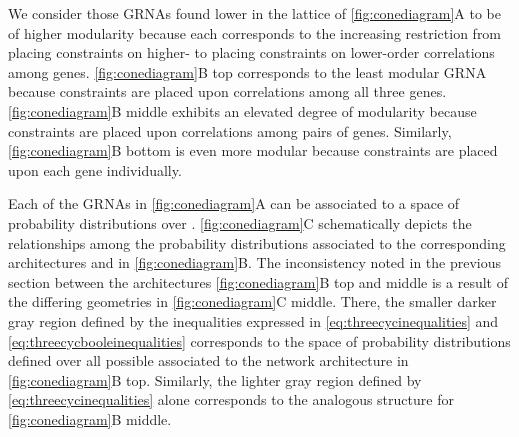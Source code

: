 We consider those GRNAs found lower in the lattice of \ref{fig:conediagram}A to be of higher modularity because each corresponds to the increasing restriction from placing constraints on higher- to placing constraints on lower-order correlations among genes. \ref{fig:conediagram}B top corresponds to the least modular GRNA because constraints are placed upon correlations among all three genes. \ref{fig:conediagram}B middle exhibits an elevated degree of modularity because constraints are placed upon correlations among pairs of genes. Similarly, \ref{fig:conediagram}B bottom is even more modular because constraints are placed upon each gene individually.

Each of the GRNAs in \ref{fig:conediagram}A can be associated to a space of probability distributions over \gnpm{}. \ref{fig:conediagram}C schematically depicts the relationships among the probability distributions associated to the corresponding architectures and \gnpm{} in \ref{fig:conediagram}B. The inconsistency noted in the previous section between the architectures \ref{fig:conediagram}B top and middle is a result of the differing geometries in \ref{fig:conediagram}C middle. There, the smaller darker gray region defined by the inequalities expressed in \ref{eq:threecycinequalities} and \ref{eq:threecycbooleinequalities} corresponds to the space of probability distributions defined over all possible \gnpm{} associated to the network architecture in \ref{fig:conediagram}B top. Similarly, the lighter gray region defined by \ref{eq:threecycinequalities} alone corresponds to the analogous structure for \ref{fig:conediagram}B middle.


